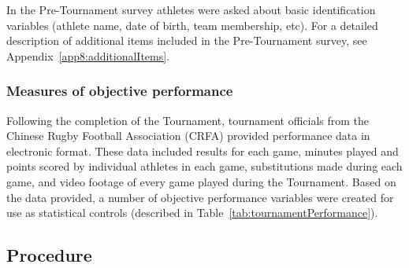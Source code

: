 \begin{CJK}{UTF8}{gbsn}
In the Pre-Tournament survey athletes were asked about basic identification variables (athlete name, date of birth, team membership, etc).  For a detailed description of additional items included in the Pre-Tournament survey, see Appendix~\ref{app8:additionalItems}.



\subsubsection{\label{app8:objectivePerformance}Measures of objective performance}
Following the completion of the Tournament, tournament officials from the Chinese Rugby Football Association (CRFA) provided performance data in electronic format. These data included results for each game, minutes played and points scored by individual athletes in each game, substitutions made during each game, and video footage of every game played during the Tournament.  Based on the data provided, a number of objective performance variables were created for use as statistical controls (described in Table~\ref{tab:tournamentPerformance}).












\subsection{Procedure}


\end{CJK}
